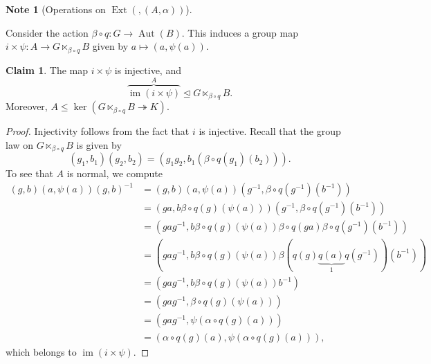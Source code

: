 \documentclass[10pt,letterpaper,cm]{nupset}
\theoremstyle{definition}
\newtheorem{note}[definition]{Note}
\theoremstyle{theorem}
\newtheorem*{claim}{Claim}
\theoremstyle{remark}
\newcommand{\1}{\mathbf{1}}
\newcommand{\0}{\vec 0}
\DeclareMathOperator{\aut}{Aut}
\DeclareMathOperator{\ext}{Ext}
\DeclareMathOperator{\im}{im}
\begin{document}
\begin{note}[Operations on $\ext(, (A, \alpha))$]
\begin{enumerate}[label=(\arabic*)]
Consider the action $\beta \circ q : G \to \aut(B)$. This induces a group map $i \times \psi : A \to G \ltimes_{\beta \circ q} B$ given by $a \mapsto \left(a, \psi(a)\right)$.
\begin{claim}
The map $i \times \psi$ is injective, and $$\overbrace{\im(i \times \psi)}^{A} \unlhd G \ltimes_{\beta \circ q} B.$$ Moreover, $A \leq \ker(G\ltimes_{\beta \circ q} B \twoheadrightarrow K)$.
\end{claim}
\begin{proof}
Injectivity follows from the fact that $i$ is injective. Recall that the group law on $G \ltimes_{\beta \circ q} B$ is given by $$\left(g_1, b_1\right)\left(g_2, b_2\right) = \left(g_1g_2, b_1(\beta \circ q(g_1)(b_2))\right).$$ To see that $A$ is normal, we compute
\begin{align*}
(g, b)(a, \psi(a))(g,b)^{-1} & = \left(g, b\right)(a, \psi(a) )(g^{-1}, \beta \circ q(g^{-1})(b^{-1})) 
\\ & = \left(ga, b\beta \circ q(g)(\psi(a))\right)(g^{-1}, \beta \circ q(g^{-1})(b^{-1}))
\\ &  = \left(gag^{-1}, b\beta \circ q(g)(\psi(a))\beta \circ q(ga)\beta \circ q(g^{-1})(b^{-1})\right)
\\ &  = \left(gag^{-1}, b\beta \circ q(g)(\psi(a)) \beta (q(g)\underbrace{q(a)}_{1}q(g^{-1}))(b^{-1})\right)
\\ & =  \left(gag^{-1}, b\beta \circ q(g)(\psi(a))b^{-1}\right) 
\\ & = \left(gag^{-1}, \beta \circ q(g)(\psi(a))\right)
\\ &  = \left(gag^{-1}, \psi(\alpha \circ q(g)(a))\right)
\\ &  = \left(\alpha \circ q(g)(a),  \psi(\alpha \circ q(g)(a))\right),
 \end{align*} 
which belongs to $\im(i \times \psi)$.


\end{proof}
\end{enumerate}
\end{note}
\end{document}
